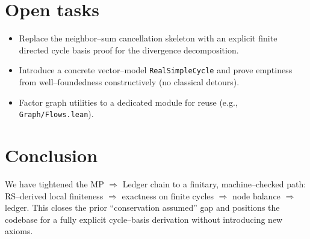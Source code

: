 \documentclass[11pt]{article}
\begin{document}
\section{Open tasks}
\begin{itemize}[leftmargin=*]
  \item Replace the neighbor–sum cancellation skeleton with an explicit finite directed cycle basis proof for the divergence decomposition.
  \item Introduce a concrete vector–model \texttt{RealSimpleCycle} and prove emptiness from well–foundedness constructively (no classical detours).
  \item Factor graph utilities to a dedicated module for reuse (e.g., \texttt{Graph/Flows.lean}).
\end{itemize}

\section*{Conclusion}
We have tightened the MP $\Rightarrow$ Ledger chain to a finitary, machine–checked path: RS–derived local finiteness $\Rightarrow$ exactness on finite cycles $\Rightarrow$ node balance $\Rightarrow$ ledger. This closes the prior “conservation assumed” gap and positions the codebase for a fully explicit cycle–basis derivation without introducing new axioms.
\end{document}
